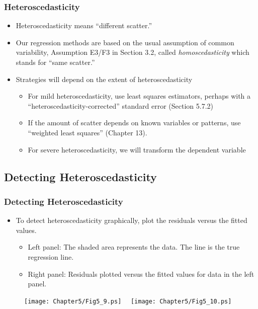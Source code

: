 \begin{frame}%
 \frametitle{Heteroscedasticity}
 \begin{itemize}
   \item Heteroscedasticity means ``different scatter.''
   \item Our regression methods are based on the usual assumption of common variability, Assumption E3/F3 in
Section 3.2, called \textit{homoscedasticity} which stands for
``same scatter.''
\item Strategies will depend on the extent of heteroscedasticity
 \begin{itemize}
   \item For mild heteroscedasticity, use least squares estimators,
   perhaps with a ``heteroscedasticity-corrected'' standard error
   (Section 5.7.2)
   \item If the amount of scatter depends on known variables or
   patterns, use ``weighted least squares'' (Chapter 13).
   \item For severe heteroscedasticity, we will transform the
   dependent variable
    \end{itemize} \end{itemize}
\end{frame}

\subsection{Detecting Heteroscedasticity}
\begin{frame}%
 \frametitle{Detecting Heteroscedasticity}
 \begin{itemize}
   \item To detect heteroscedasticity graphically, plot the residuals
versus the fitted values.
 \begin{itemize}
   \item Left panel: The shaded area
represents the data. The line is the true regression line.
   \item Right panel: Residuals plotted
versus the fitted values for data in the left panel.
    \end{itemize}  \end{itemize}
\begin{figure}[htp]
    \texttt{[image: Chapter5/Fig5\_9.ps]}
    $~~~$
    \texttt{[image: Chapter5/Fig5\_10.ps]}    \hfill
\end{figure}

\end{frame}

